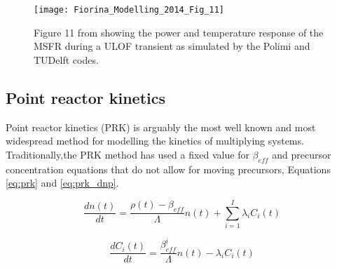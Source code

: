 \documentclass[review]{elsarticle}
\begin{document}
\begin{figure}[H]
   \centering
   \texttt{[image: Fiorina\_Modelling\_2014\_Fig\_11]}
   \caption{Figure 11 from \cite{fiorina_modelling_2014} showing the power and temperature
   response of the MSFR during a ULOF transient as simulated by the Polimi and TUDelft codes.} 
   \label{fig:fiorina_msfr_ulof}
\end{figure}

\subsection{Point reactor kinetics} \label{ssec:prk}
Point reactor kinetics (PRK) is arguably the most well known and most widespread
method for modelling the kinetics of multiplying systems. Traditionally,the PRK
method has used a fixed value for $\beta_{eff}$ and precursor concentration
equations
that do not allow for moving precursors, Equations \ref{eq:prk} and
\ref{eq:prk_dnp}.

\begin{equation}
    \label{eq:prk}
    \frac{dn(t)}{dt} = \frac{\rho(t) - \beta_{eff}}{\Lambda} n(t) +
     \sum_{i = 1}^{I} \lambda_{i} C_{i}(t)
\end{equation}

\begin{equation}
    \label{eq:prk_dnp}
    \frac{dC_{i}(t)}{dt} = \frac{\beta_{eff}^{i}}{\Lambda} n(t) -
        \lambda_{i} C_{i}(t)
\end{equation}
\end{document}
